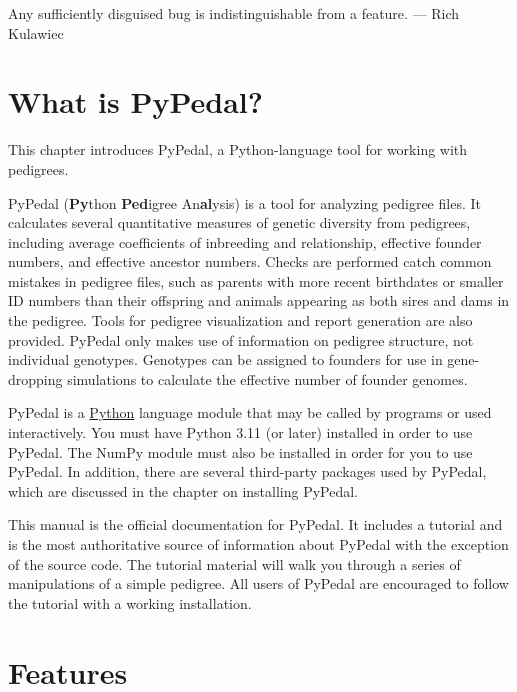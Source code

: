 \documentclass[
  letterpaper,
  DIV=11,
  numbers=noendperiod]{scrreprt}
\begin{document}
\begin{tcolorbox}[enhanced jigsaw, colframe=quarto-callout-tip-color-frame, bottomrule=.15mm, toprule=.15mm, colback=white, left=2mm, breakable, rightrule=.15mm, leftrule=.75mm, opacityback=0, arc=.35mm]

Any sufficiently disguised bug is indistinguishable from a feature. ---
Rich Kulawiec

\end{tcolorbox}

\section{What is PyPedal?}\label{what-is-pypedal}

This chapter introduces PyPedal, a Python-language tool for working with
pedigrees.

PyPedal (\textbf{Py}thon \textbf{Ped}igree An\textbf{al}ysis) is a tool
for analyzing pedigree files. It calculates several quantitative
measures of genetic diversity from pedigrees, including average
coefficients of inbreeding and relationship, effective founder numbers,
and effective ancestor numbers. Checks are performed catch common
mistakes in pedigree files, such as parents with more recent birthdates
or smaller ID numbers than their offspring and animals appearing as both
sires and dams in the pedigree. Tools for pedigree visualization and
report generation are also provided. PyPedal only makes use of
information on pedigree structure, not individual genotypes. Genotypes
can be assigned to founders for use in gene-dropping simulations to
calculate the effective number of founder genomes.

PyPedal is a \href{http://www.python.org/}{Python} language module that
may be called by programs or used interactively. You must have Python
3.11 (or later) installed in order to use PyPedal. The NumPy module must
also be installed in order for you to use PyPedal. In addition, there
are several third-party packages used by PyPedal, which are discussed in
the chapter on installing PyPedal.

This manual is the official documentation for PyPedal. It includes a
tutorial and is the most authoritative source of information about
PyPedal with the exception of the source code. The tutorial material
will walk you through a series of manipulations of a simple pedigree.
All users of PyPedal are encouraged to follow the tutorial with a
working installation.

\section{Features}\label{features}
\end{document}
